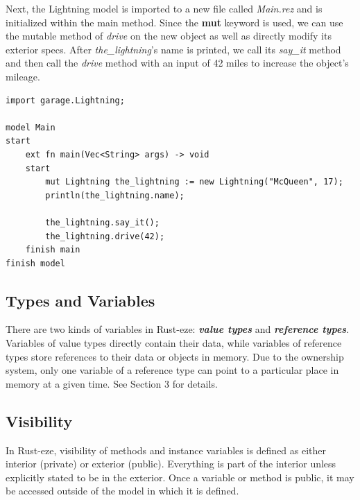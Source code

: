 \documentclass[letterpaper, 10pt, DIV=13]{scrartcl}
\numberwithin{equation}{section}
\numberwithin{figure}{section}
\numberwithin{table}{section}
\begin{document}
Next, the Lightning model is imported to a new file called \textit{Main.rez}
and is initialized within the main method. Since the \textbf{mut} keyword is
used, we can use the mutable method of \textit{drive} on the new object as well
as directly modify its exterior specs. After \textit{the\_lightning}'s
name is printed, we call its \textit{say\_it} method and then call the
\textit{drive} method with an input of 42 miles to increase the object's mileage.

\begin{lstlisting}[caption = Main.rez, frame = single, nolol]
import garage.Lightning;

model Main
start
    ext fn main(Vec<String> args) -> void
    start
        mut Lightning the_lightning := new Lightning("McQueen", 17);
        println(the_lightning.name);

        the_lightning.say_it();
        the_lightning.drive(42);
    finish main
finish model
\end{lstlisting}

\subsection{Types and Variables}
There are two kinds of variables in Rust-eze: \textbf{\textit{value types}} and
\textbf{\textit{reference types}}. Variables of value types directly contain
their data, while variables of reference types store references to their data or
objects in memory. Due to the ownership system, only one variable of a reference
type can point to a particular place in memory at a given time. See Section 3
for details.

\subsection{Visibility}
In Rust-eze, visibility of methods and instance variables is defined as either
interior (private) or exterior (public). Everything is part of the interior unless
explicitly stated to be in the exterior. Once a variable or method is public,
it may be accessed outside of the model in which it is defined.
\end{document}
